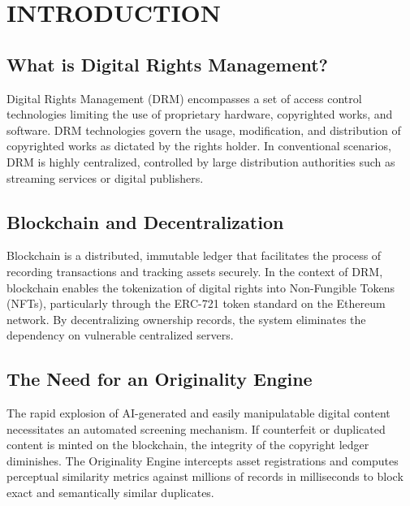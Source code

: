 \documentclass[12pt,a4paper]{report}
\begin{document}
\newpage
\listoffigures

\newpage
\listoftables

\clearpage
{}
\setcounter{page}{1}

\chapter{INTRODUCTION}

\section{What is Digital Rights Management?}
Digital Rights Management (DRM) encompasses a set of access control technologies limiting the use of proprietary hardware, copyrighted works, and software. DRM technologies govern the usage, modification, and distribution of copyrighted works as dictated by the rights holder. In conventional scenarios, DRM is highly centralized, controlled by large distribution authorities such as streaming services or digital publishers.

\section{Blockchain and Decentralization}
Blockchain is a distributed, immutable ledger that facilitates the process of recording transactions and tracking assets securely. In the context of DRM, blockchain enables the tokenization of digital rights into Non-Fungible Tokens (NFTs), particularly through the ERC-721 token standard on the Ethereum network. By decentralizing ownership records, the system eliminates the dependency on vulnerable centralized servers.

\section{The Need for an Originality Engine}
The rapid explosion of AI-generated and easily manipulatable digital content necessitates an automated screening mechanism. If counterfeit or duplicated content is minted on the blockchain, the integrity of the copyright ledger diminishes. The Originality Engine intercepts asset registrations and computes perceptual similarity metrics against millions of records in milliseconds to block exact and semantically similar duplicates.
\end{document}
